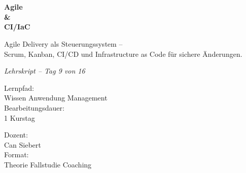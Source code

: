 \documentclass[11pt,a4paper,oneside]{article}
\newcommand{\caveatfontfallback}{\itshape}
\newcommand\caveatfont{\caveatfontfallback}%
\begin{document}
\begin{titlepage}
  \pagestyle{empty}
  \vspace*{1.5cm}
  \\[2pt]
  \noindent{\color{lpAccent}\rule{\linewidth}{1.2pt}}\\[4pt]

  \vspace{3cm}
  {\sffamily\fontsize{30}{34}\selectfont\bfseries\color{lpInk}Agile\\\&\\CI/IaC\par}

  \vspace{0.7cm}
  {\sffamily\large\color{lpGray}Agile Delivery als Steuerungssystem --\\Scrum, Kanban, CI/CD und Infrastructure as Code für sichere Änderungen.\par}

  \vspace{1.5cm}
  {\caveatfont\LARGE\color{lpAmber}Lehrskript -- Tag 9 von 16}\par

  \vfill

  \noindent\begin{minipage}{0.55\linewidth}
    {\sffamily\footnotesize\color{lpGray}Lernpfad:}\\
    {\sffamily\small\color{lpInk}Wissen \textrightarrow{} Anwendung \textrightarrow{} Management}\\[10pt]
    {\sffamily\footnotesize\color{lpGray}Bearbeitungsdauer:}\\
    {\sffamily\small\color{lpInk}1 Kurstag}
  \end{minipage}\hfill
  \begin{minipage}{0.4\linewidth}
    \raggedleft
    {\sffamily\footnotesize\color{lpGray}Dozent:}\\
    {\sffamily\small\color{lpInk}Can Siebert}\\[10pt]
    {\sffamily\footnotesize\color{lpGray}Format:}\\
    {\sffamily\small\color{lpInk}Theorie \textperiodcentered{} Fallstudie \textperiodcentered{} Coaching}
  \end{minipage}

  \vspace{0.5cm}
  \noindent{\color{lpAccent}\rule{\linewidth}{0.6pt}}
\end{titlepage}
\end{document}
